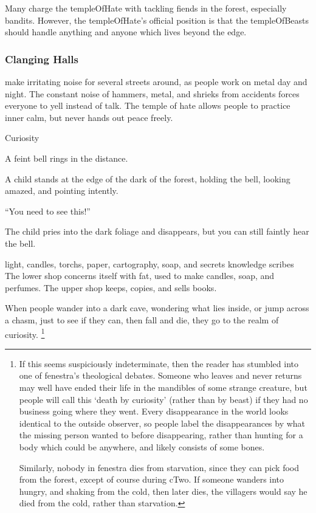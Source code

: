 \begin{multicols}{2}
Many charge the \gls{templeOfHate} with tackling \glspl{fiend} in the forest, especially bandits.
However, the \gls{templeOfHate}'s official position is that the \gls{templeOfBeasts} should handle anything and anyone which lives beyond the \gls{edge}.

\subsubsection{Clanging Halls}
make irritating noise for several streets around, as people work on metal day and night.
The constant noise of hammers, metal, and shrieks from accidents forces everyone to yell instead of talk.
The temple of hate allows people to practice inner calm, but never hands out peace freely.

  {Curiosity}%
  {
    A feint bell rings in the distance.

    A child stands at the edge of the dark of the forest, holding the bell, looking amazed, and pointing intently.

    {\sffamily``You need to see this!''}

    The child pries into the dark foliage and disappears, but you can still faintly hear the bell.
  }%
  {light, candles, \glspl{torch}, paper, cartography, soap, and secrets}%
  {knowledge}%
  {\Glspl{scribe}}%
  {
    The lower shop concerns itself with fat, used to make candles, soap, and perfumes.
    The upper shop keeps, copies, and sells books.
  }%


When people wander into a dark cave, wondering what lies inside, or jump across a chasm, just to see if they can, then fall and die, they go to the realm of curiosity.%
\footnote{If this seems suspiciously indeterminate, then the reader has stumbled into one of \gls{fenestra}'s theological debates.
Someone who leaves and never returns may well have ended their life in the mandibles of some strange creature, but people will call this `death by curiosity' (rather than by beast) if they had no business going where they went.
Every disappearance in the world looks identical to the outside observer, so people label the disappearances by what the missing person wanted to before disappearing, rather than hunting for a body which could be anywhere, and likely consists of some bones.

Similarly, nobody in \gls{fenestra} dies from starvation, since they can pick food from the forest, except of course during \gls{cTwo}.
If someone wanders into  hungry, and shaking from the cold, then later dies, the villagers would say he died from the cold, rather than starvation.}


\end{multicols}
